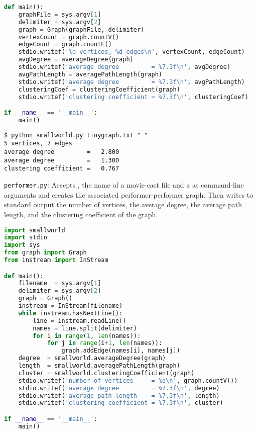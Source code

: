 \documentclass[8pt,a4paper,compress,handout]{beamer}
\begin{document}
\begin{frame}[fragile]
\begin{lstlisting}[language=Python]
def main():
    graphFile = sys.argv[1]
    delimiter = sys.argv[2]
    graph = Graph(graphFile, delimiter)
    vertexCount = graph.countV()
    edgeCount = graph.countE()
    stdio.writef('%d vertices, %d edges\n', vertexCount, edgeCount)
    avgDegree = averageDegree(graph)
    stdio.writef('average degree         = %7.3f\n', avgDegree)
    avgPathLength = averagePathLength(graph)
    stdio.writef('average degree         = %7.3f\n', avgPathLength)
    clusteringCoef = clusteringCoefficient(graph)
    stdio.writef('clustering coefficient = %7.3f\n', clusteringCoef)

if __name__ == '__main__':
    main()
\end{lstlisting}

\begin{lstlisting}[language={}]
$ python smallworld.py tinygraph.txt " "
5 vertices, 7 edges
average degree         =   2.800
average degree         =   1.300
clustering coefficient =   0.767
\end{lstlisting}
\end{frame}

\begin{frame}[fragile]
\begin{framed}
\tiny \lstinline{performer.py}: Accepts , the name of a movie-cast file and a  as command-line arguments and creates the associated performer-performer graph. Then writes
to standard output the number of vertices, the average degree, 
the average path length, and the clustering coefficient of the graph.
\end{framed}

\begin{lstlisting}[language=Python]
import smallworld
import stdio
import sys
from graph import Graph
from instream import InStream

def main():
    filename  = sys.argv[1]
    delimiter = sys.argv[2]
    graph = Graph()
    instream = InStream(filename)
    while instream.hasNextLine():
        line = instream.readLine()
        names = line.split(delimiter)
        for i in range(1, len(names)):
            for j in range(i+1, len(names)):
                graph.addEdge(names[i], names[j])
    degree  = smallworld.averageDegree(graph)
    length  = smallworld.averagePathLength(graph)
    cluster = smallworld.clusteringCoefficient(graph)
    stdio.writef('number of vertices     = %d\n', graph.countV())
    stdio.writef('average degree         = %7.3f\n', degree)
    stdio.writef('average path length    = %7.3f\n', length)
    stdio.writef('clustering coefficient = %7.3f\n', cluster)

if __name__ == '__main__':
    main()
\end{lstlisting}
\end{frame}
\end{document}
